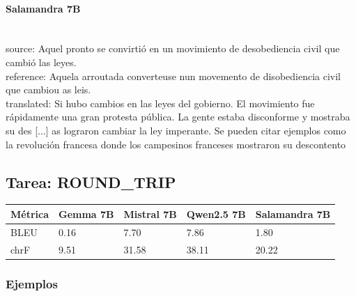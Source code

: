 \paragraph{Salamandra 7B}~\\
{source:} Aquel pronto se convirtió en un movimiento de desobediencia civil que cambió las leyes. \\
{reference:} Aquela arroutada converteuse nun movemento de disobediencia civil que cambiou as leis. \\
{translated:} Si hubo cambios en las leyes del gobierno.  El movimiento fue rápidamente una gran protesta pública. La gente estaba disconforme y mostraba su des [...] as lograron cambiar la ley imperante. Se pueden citar ejemplos como la revolución francesa donde los campesinos franceses mostraron su descontento\\

\subsection{Tarea: ROUND\_TRIP}\label{tarea-round_trip}
{\def\LTcaptype{none}
\begin{longtable}[]{@{}lllll@{}}
\toprule\noalign{}
Métrica & Gemma 7B & Mistral 7B & Qwen2.5 7B & Salamandra 7B \\
\midrule\noalign{}
\endhead
\bottomrule\noalign{}
\endlastfoot
BLEU & 0.16 & 7.70 & 7.86 & 1.80 \\
chrF & 9.51 & 31.58 & 38.11 & 20.22 \\
\end{longtable}}

\subsubsection{Ejemplos}

